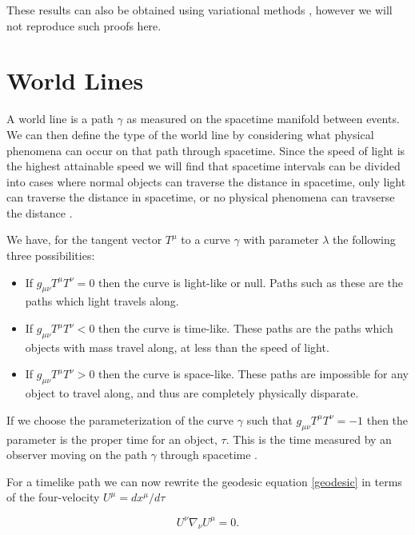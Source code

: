 These results can also be obtained using variational methods \cite{carroll}, however we will not reproduce such proofs here. 

\section{World Lines}

A world line is a path \(\gamma\) as measured on the spacetime manifold between events. We can then define the type of the world line by considering what physical phenomena can occur on that path through spacetime. Since the speed of light is the highest attainable speed we will find that spacetime intervals can be divided into cases where normal objects can traverse the distance in spacetime, only light can traverse the distance in spacetime, or no physical phenomena can travserse the distance \cite{cheng, hartle, carroll}. 

We have, for the tangent vector \(T^{\mu}\) to a curve \(\gamma\) with parameter \(\lambda\) the following three possibilities:

\begin{itemize}
	\item If \(g_{\mu \nu} T^{\mu} T^{\nu} = 0\) then the curve is light-like or null. Paths such as these are the paths which light travels along.
	\item If \(g_{\mu \nu} T^{\mu} T^{\nu} < 0\) then the curve is time-like. These paths are the paths which objects with mass travel along, at less than the speed of light.
	\item If \(g_{\mu \nu} T^{\mu} T^{\nu} > 0\) then the curve is space-like. These paths are impossible for any object to travel along, and thus are completely physically disparate.
\end{itemize}

If we choose the parameterization of the curve \(\gamma\) such that \(g_{\mu \nu} T^{\mu} T^{\nu} = -1\) then the parameter is the proper time for an object, \(\tau\). This is the time measured by an observer moving on the path \(\gamma\) through spacetime \cite{cheng}.

For a timelike path we can now rewrite the geodesic equation \eqref{geodesic} in terms of the four-velocity \cite{carroll} \(U^{\mu} = dx^{\mu} / d \tau\)

\begin{equation} \label{geodesic-timelike}
	U^{\nu} \nabla_{\nu} U^{\mu} = 0 .
\end{equation}

